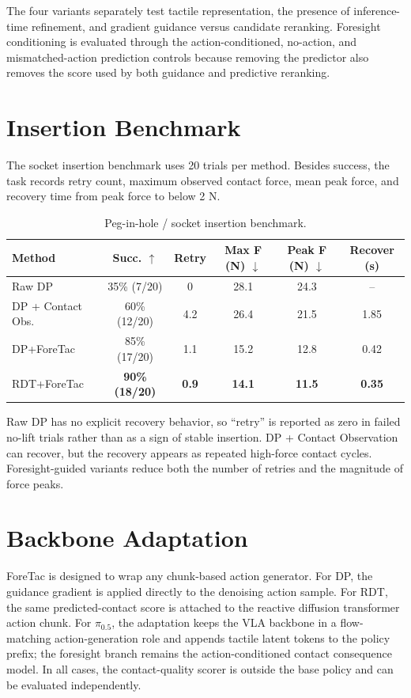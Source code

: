 \documentclass[10pt,letterpaper]{article}
\newcommand{\method}{ForeTac}
\newcommand{\tabstyle}{\small\setlength{\tabcolsep}{3pt}\renewcommand{\arraystretch}{1.15}}
\begin{document}
The four variants separately test tactile representation, the presence of
inference-time refinement, and gradient guidance versus candidate reranking.
Foresight conditioning is evaluated through the action-conditioned, no-action,
and mismatched-action prediction controls because removing the predictor also
removes the score used by both guidance and predictive reranking.

\section{Insertion Benchmark}
\label{sec:insertion}

The socket insertion benchmark uses 20 trials per method. Besides success, the
task records retry count, maximum observed contact force, mean peak force, and
recovery time from peak force to below 2 N.

\begin{table}[H]
\caption{Peg-in-hole / socket insertion benchmark.}
\label{tab:insertion_appendix}
\centering
\tabstyle
\begin{tabular}{lccccc}
\toprule
Method & Succ. $\uparrow$ & Retry & Max F (N) $\downarrow$ & Peak F (N) $\downarrow$ & Recover (s)\\
\midrule
Raw DP & 35\% (7/20) & 0 & 28.1 & 24.3 & --\\
DP + Contact Obs. & 60\% (12/20) & 4.2 & 26.4 & 21.5 & 1.85\\
DP+ForeTac & 85\% (17/20) & 1.1 & 15.2 & 12.8 & 0.42\\
RDT+ForeTac & \textbf{90\% (18/20)} & \textbf{0.9} & \textbf{14.1} & \textbf{11.5} & \textbf{0.35}\\
\bottomrule
\end{tabular}
\end{table}

Raw DP has no explicit recovery behavior, so ``retry'' is reported as zero in
failed no-lift trials rather than as a sign of stable insertion. DP + Contact Observation can
recover, but the recovery appears as repeated high-force contact cycles.
Foresight-guided variants reduce both the number of retries and the magnitude
of force peaks.

\section{Backbone Adaptation}
\label{sec:backbone}

\method{} is designed to wrap any chunk-based action generator. For DP, the
guidance gradient is applied directly to the denoising action sample. For RDT,
the same predicted-contact score is attached to the reactive diffusion
transformer action chunk. For $\pi_{0.5}$, the adaptation keeps the VLA
backbone in a flow-matching action-generation role and appends tactile latent
tokens to the policy prefix; the foresight branch remains the action-conditioned
contact consequence model. In all cases, the contact-quality scorer is outside
the base policy and can be evaluated independently.
\end{document}
